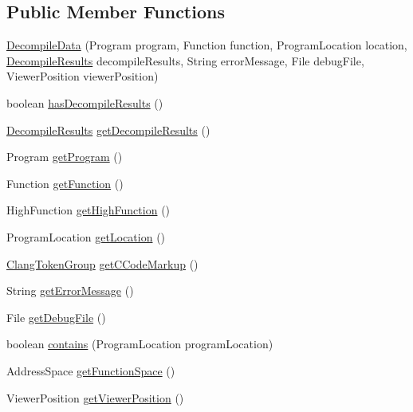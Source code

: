 \subsection*{Public Member Functions}
\begin{DoxyCompactItemize}
\item 
\mbox{\hyperlink{classghidra_1_1app_1_1decompiler_1_1component_1_1_decompile_data_a3805009a5dd175e773c05baf6e932890}{Decompile\+Data}} (Program program, Function function, Program\+Location location, \mbox{\hyperlink{classghidra_1_1app_1_1decompiler_1_1_decompile_results}{Decompile\+Results}} decompile\+Results, String error\+Message, File debug\+File, Viewer\+Position viewer\+Position)
\item 
boolean \mbox{\hyperlink{classghidra_1_1app_1_1decompiler_1_1component_1_1_decompile_data_afe7d40154cfc399880f249ee76855092}{has\+Decompile\+Results}} ()
\item 
\mbox{\hyperlink{classghidra_1_1app_1_1decompiler_1_1_decompile_results}{Decompile\+Results}} \mbox{\hyperlink{classghidra_1_1app_1_1decompiler_1_1component_1_1_decompile_data_a1c05130998f0fdd4e0b3425c0e65c32d}{get\+Decompile\+Results}} ()
\item 
Program \mbox{\hyperlink{classghidra_1_1app_1_1decompiler_1_1component_1_1_decompile_data_adbfd7703f02e3b05c83f394536058f05}{get\+Program}} ()
\item 
Function \mbox{\hyperlink{classghidra_1_1app_1_1decompiler_1_1component_1_1_decompile_data_a344a21308e8c0e6343e89093be319ac9}{get\+Function}} ()
\item 
High\+Function \mbox{\hyperlink{classghidra_1_1app_1_1decompiler_1_1component_1_1_decompile_data_a9a68b970260d588ab262e60a5d252a5e}{get\+High\+Function}} ()
\item 
Program\+Location \mbox{\hyperlink{classghidra_1_1app_1_1decompiler_1_1component_1_1_decompile_data_ac0b46cb708b62200beb3c11a0b2a42db}{get\+Location}} ()
\item 
\mbox{\hyperlink{classghidra_1_1app_1_1decompiler_1_1_clang_token_group}{Clang\+Token\+Group}} \mbox{\hyperlink{classghidra_1_1app_1_1decompiler_1_1component_1_1_decompile_data_a91564dbcfda4a4812e77a3ce7475b267}{get\+C\+Code\+Markup}} ()
\item 
String \mbox{\hyperlink{classghidra_1_1app_1_1decompiler_1_1component_1_1_decompile_data_a4aeb6c97052990e46d6fbe2ed6794a57}{get\+Error\+Message}} ()
\item 
File \mbox{\hyperlink{classghidra_1_1app_1_1decompiler_1_1component_1_1_decompile_data_a05529f0d3b3879b174bdf44fb5535933}{get\+Debug\+File}} ()
\item 
boolean \mbox{\hyperlink{classghidra_1_1app_1_1decompiler_1_1component_1_1_decompile_data_abcc52036aeb7616c47c98e5314c7c8bd}{contains}} (Program\+Location program\+Location)
\item 
Address\+Space \mbox{\hyperlink{classghidra_1_1app_1_1decompiler_1_1component_1_1_decompile_data_a615d95992bf1abc8bee6b75cd6c0f663}{get\+Function\+Space}} ()
\item 
Viewer\+Position \mbox{\hyperlink{classghidra_1_1app_1_1decompiler_1_1component_1_1_decompile_data_aa6c698958953e64ed55f549912af2163}{get\+Viewer\+Position}} ()
\end{DoxyCompactItemize}


